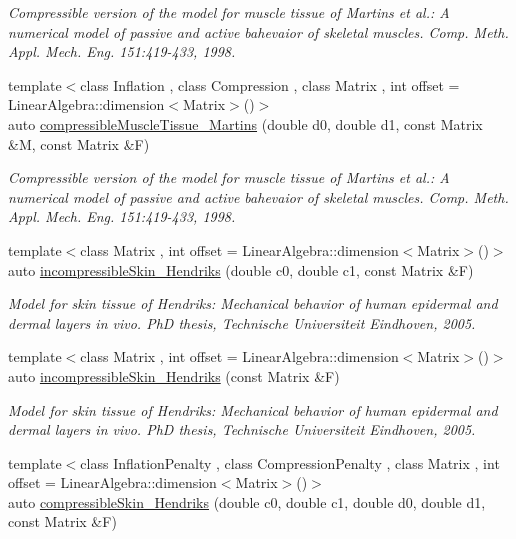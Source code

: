 \begin{DoxyCompactItemize}
\begin{DoxyCompactList}\small\item\em Compressible version of the model for muscle tissue of Martins et al.\-: A numerical model of passive and active bahevaior of skeletal muscles. Comp. Meth. Appl. Mech. Eng. 151\-:419-\/433, 1998. \end{DoxyCompactList}\item 
{\footnotesize template$<$class Inflation , class Compression , class Matrix , int offset = Linear\-Algebra\-::dimension$<$\-Matrix$>$()$>$ }\\auto \hyperlink{group__Biomechanics_ga46a70ccb2285e12addad87b6a8aaaae8}{compressible\-Muscle\-Tissue\-\_\-\-Martins} (double d0, double d1, const Matrix \&M, const Matrix \&F)
\begin{DoxyCompactList}\small\item\em Compressible version of the model for muscle tissue of Martins et al.\-: A numerical model of passive and active bahevaior of skeletal muscles. Comp. Meth. Appl. Mech. Eng. 151\-:419-\/433, 1998. \end{DoxyCompactList}\item 
{\footnotesize template$<$class Matrix , int offset = Linear\-Algebra\-::dimension$<$\-Matrix$>$()$>$ }\\auto \hyperlink{group__Biomechanics_gaa20bf15ef6976d64d89490429035b2c4}{incompressible\-Skin\-\_\-\-Hendriks} (double c0, double c1, const Matrix \&F)
\begin{DoxyCompactList}\small\item\em Model for skin tissue of Hendriks\-: Mechanical behavior of human epidermal and dermal layers in vivo. Ph\-D thesis, Technische Universiteit Eindhoven, 2005. \end{DoxyCompactList}\item 
{\footnotesize template$<$class Matrix , int offset = Linear\-Algebra\-::dimension$<$\-Matrix$>$()$>$ }\\auto \hyperlink{group__Biomechanics_gad8653218bd2afb4e3cfd601a5142956c}{incompressible\-Skin\-\_\-\-Hendriks} (const Matrix \&F)
\begin{DoxyCompactList}\small\item\em Model for skin tissue of Hendriks\-: Mechanical behavior of human epidermal and dermal layers in vivo. Ph\-D thesis, Technische Universiteit Eindhoven, 2005. \end{DoxyCompactList}\item 
{\footnotesize template$<$class Inflation\-Penalty , class Compression\-Penalty , class Matrix , int offset = Linear\-Algebra\-::dimension$<$\-Matrix$>$()$>$ }\\auto \hyperlink{group__Biomechanics_ga07b4c52c6ecf7e72f73ab5832fb262cd}{compressible\-Skin\-\_\-\-Hendriks} (double c0, double c1, double d0, double d1, const Matrix \&F)

\end{DoxyCompactItemize}
